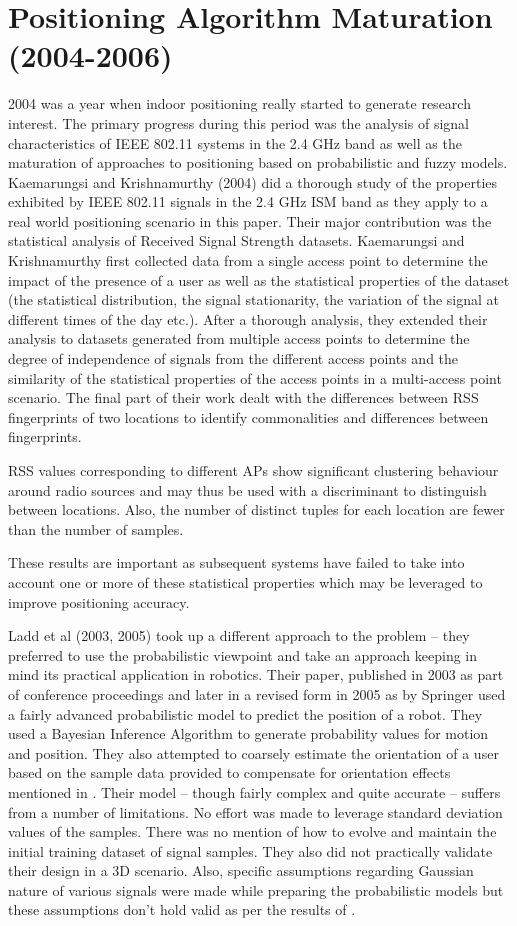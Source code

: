 \section{Positioning Algorithm Maturation (2004-2006)}
2004 was a year when indoor positioning really started to generate research interest. The primary progress during this period was the analysis of signal characteristics of IEEE 802.11 systems in the 2.4 GHz band as well as the maturation of approaches to positioning based on probabilistic and fuzzy models.
Kaemarungsi and Krishnamurthy (2004)  did a thorough study of the properties exhibited by IEEE 802.11 signals in the 2.4 GHz ISM band as they apply to a real world positioning scenario in this paper. Their major contribution was the statistical analysis of Received Signal Strength datasets. Kaemarungsi and Krishnamurthy first collected data from a single access point to determine the impact of the presence of a user as well as the statistical properties of the dataset (the statistical distribution, the signal stationarity, the variation of the signal at different times of the day etc.). After a thorough analysis, they extended their analysis to datasets generated from multiple access points to determine the degree of independence of signals from the different access points and the similarity of the statistical properties of the access points in a multi-access point scenario. The final part of their work dealt with the differences between RSS fingerprints of two locations to identify commonalities and differences between fingerprints.

RSS values corresponding to different APs show significant clustering behaviour around radio sources and may thus be used with a discriminant to distinguish between locations. Also, the number of distinct tuples for each location are fewer than the number of samples.

These results are important as subsequent systems have failed to take into account one or more of these statistical properties which may be leveraged to improve positioning accuracy. 

Ladd et al (2003, 2005) took up a different approach to the problem – they preferred to use the probabilistic viewpoint and take an approach keeping in mind its practical application in robotics. Their paper, published in 2003 as part of conference proceedings and later in a revised form in 2005 as  by Springer used a fairly advanced probabilistic model to predict the position of a robot. They used a Bayesian Inference Algorithm to generate probability values for motion and position. They also attempted to coarsely estimate the orientation of a user based on the sample data provided to compensate for orientation effects mentioned in . Their model – though fairly complex and quite accurate – suffers from a number of limitations. No effort was made to leverage standard deviation values of the samples. There was no mention of how to evolve and maintain the initial training dataset of signal samples. They also did not practically validate their design in a 3D scenario. Also, specific assumptions regarding Gaussian nature of various signals were made while preparing the probabilistic models but these assumptions don’t hold valid as per the results of .

